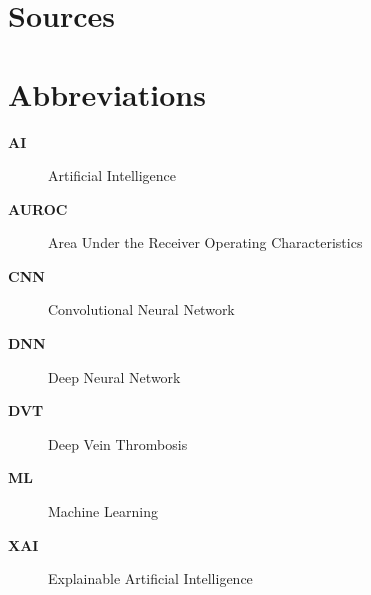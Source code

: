 {}
\listoffigures
\clearpage

{}
\listoftables
\clearpage

{}
\chapter*{Sources}

\printbibliography[heading=subbibintoc, nottype=online, nottype=software]

\printbibliography[heading=subbibintoc, type=online, title=Websites]

\printbibliography[heading=subbibintoc, type=software, title=Software]
\begin{comment}
Software-Name mit Versionsnummer und Link zur Website. Nur was für die konkrete Arbeit relevant ist. Das Sie die Arbeit mit Word geschrieben haben, ist irrelevant. Das sieht man. LaTeX auch.
\end{comment}
\clearpage

{}
\chapter*{Abbreviations}
\begin{description}
    \item [\textbf{AI}] Artificial Intelligence
    \item [\textbf{AUROC}] Area Under the Receiver Operating Characteristics
    \item [\textbf{CNN}] Convolutional Neural Network
    \item [\textbf{DNN}] Deep Neural Network
    \item [\textbf{DVT}] Deep Vein Thrombosis
    \item [\textbf{ML}] Machine Learning
    \item [\textbf{XAI}] Explainable Artificial Intelligence
\end{description}
\clearpage

{}

